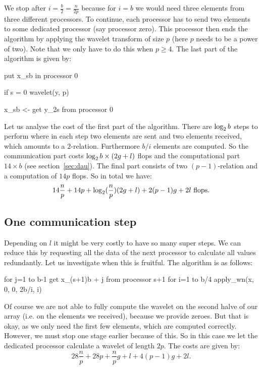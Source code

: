 We stop after $i=\frac{b}{2}=\frac{n}{2p}$ because for $i=b$ we would need three elements from three different processors. To continue, each processor has to send two elements to some dedicated processor (say processor zero). This processor then ends the algorithm by applying the wavelet transform of size $p$ (here $p$ needs to be a power of two). Note that we only have to do this when $p \geq 4$. The last part of the algorithm is given by:

\begin{lstlistings}
put x_{sb} in processor 0

if s = 0
	wavelet(y, p)

x_{sb} <- get y_{2s} from processor 0
\end{lstlistings}

Let us analyse the cost of the first part of the algorithm. There are $\operatorname{\log_2}{b}$ steps to perform where in each step two elements are sent and two elements received, which amounts to a $2$-relation. Furthermore $b/i$ elements are computed. So the communication part costs $\operatorname{\log_2}{b}\times(2g+l)$ flops and the computational part $14 \times b$ (see section~\ref{sec:dau}). The final part consists of two $(p-1)$-relation and a computation of $14p$ flops. So in total we have:
\[ 14\frac{n}{p} + 14p + \operatorname{\log_2}(\frac{n}{p})(2g + l) + 2(p-1)g + 2l \text{ flops}.\]


\subsection{One communication step}
Depending on $l$ it might be very costly to have so many super steps. We can reduce this by requesting all the data of the next processor to calculate all values redundantly. Let us investigate when this is fruitful. The algorithm is as follows:

\begin{lstlistings}
for j=1 to b-1
	get x_{(s+1)b + j} from processor s+1
for i=1 to b/4
	apply_wn(x, 0, 0, 2b/i, i)
\end{lstlistings}

Of course we are not able to fully compute the wavelet on the second halve of our array (i.e. on the elements we received), because we provide zeroes. But that is okay, as we only need the first few elements, which are computed correctly. However, we must stop one stage earlier because of this. So in this case we let the dedicated processor calculate a wavelet of length $2p$. The costs are given by:
\[ 28\frac{n}{p} + 28p + \frac{n}{p}g + l + 4(p-1)g + 2l. \]


